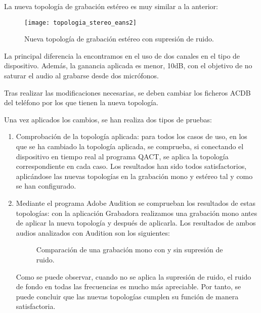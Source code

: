 La nueva topología de grabación estéreo es muy similar a la anterior:

\begin{figure}[H]
	\centering
	\texttt{[image: topologia\_stereo\_eans2]}
	\caption{Nueva topología de grabación estéreo con supresión de ruido.} 
	\label{fig:stereo_eans2}
\end{figure}

La principal diferencia la encontramos en el uso de dos canales en el tipo de dispositivo. Además, la ganancia aplicada es menor, 10\gls{dB}, con el objetivo de no saturar el audio al grabarse desde dos micrófonos.

Tras realizar las modificaciones necesarias, se deben cambiar los ficheros \gls{ACDB} del teléfono por los que tienen la nueva topología.

Una vez aplicados los cambios, se han realiza dos tipos de pruebas:

\begin{enumerate}
	\item Comprobación de la topología aplicada: para todos los casos de uso, en los que se ha cambiado la topología aplicada, se comprueba, si conectando el dispositivo en tiempo real al programa \gls{QACT}, se aplica la topología correspondiente en cada caso. Los resultados han sido todos satisfactorios, aplicándose las nuevas topologías en la grabación mono y estéreo tal y como se han configurado.
	\item Mediante el programa Adobe Audition se comprueban los resultados de estas topologías: con la aplicación Grabadora realizamos una grabación mono antes de aplicar la nueva topología y después de aplicarla. Los resultados de ambos audios analizados con Audition son los siguientes:
	\begin{figure}[H]
		\centering
		\caption{Comparación de una grabación mono con y sin supresión de ruido.} \label{fig:comparacion_eans_on_off}
	\end{figure}
	
	Como se puede observar, cuando no se aplica la supresión de ruido, el ruido de fondo en todas las frecuencias es mucho más apreciable. Por tanto, se puede concluir que las nuevas topologías cumplen su función de manera satisfactoria.
\end{enumerate}

